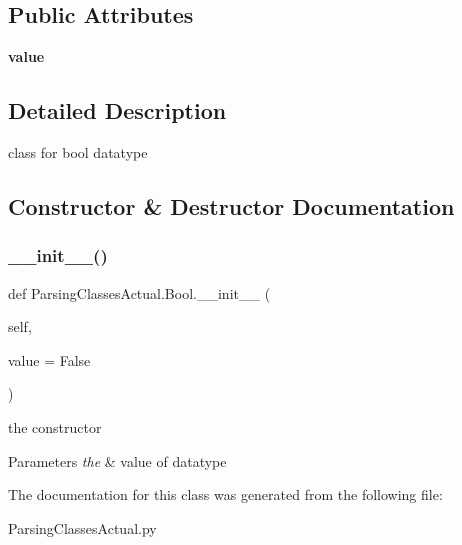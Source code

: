 \subsection*{Public Attributes}
\begin{DoxyCompactItemize}
\item 
\mbox{\label{class_parsing_classes_actual_1_1_bool_a7ed07bd1a1ca36b2378a72207546133c}} 
{\bfseries value}
\end{DoxyCompactItemize}


\subsection{Detailed Description}
class for bool datatype 

\subsection{Constructor \& Destructor Documentation}
\mbox{\label{class_parsing_classes_actual_1_1_bool_aff31c651efc789989951939a86fcc028}} 
\subsubsection{\texorpdfstring{\+\_\+\+\_\+init\+\_\+\+\_\+()}{\_\_init\_\_()}}
{\footnotesize\ttfamily def Parsing\+Classes\+Actual.\+Bool.\+\_\+\+\_\+init\+\_\+\+\_\+ (\begin{DoxyParamCaption}\item[{}]{self,  }\item[{}]{value = {\ttfamily False} }\end{DoxyParamCaption})}



the constructor 


\begin{DoxyParams}{Parameters}
{\em the} & value of datatype \\
\hline
\end{DoxyParams}


The documentation for this class was generated from the following file\+:\begin{DoxyCompactItemize}
\item 
Parsing\+Classes\+Actual.\+py\end{DoxyCompactItemize}

